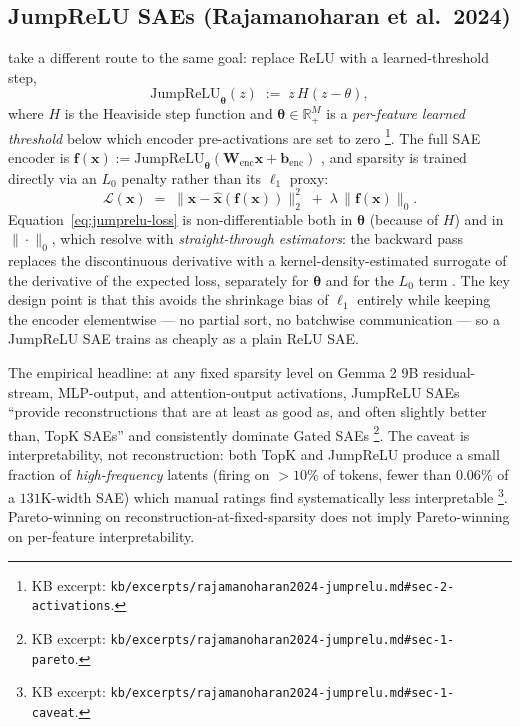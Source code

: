 \subsection{JumpReLU SAEs (Rajamanoharan et al.\ 2024)}
\label{sec:sae-jumprelu}

\citet{rajamanoharan2024-jumprelu} take a different route to the same
goal: replace ReLU with a learned-threshold step,
\begin{equation}
  \mathrm{JumpReLU}_{\boldsymbol{\theta}}(z) \;:=\; z\,H(z - \theta),
  \label{eq:jumprelu}
\end{equation}
where $H$ is the Heaviside step function and
$\boldsymbol{\theta} \in \mathbb{R}^M_+$ is a \emph{per-feature learned
threshold} below which encoder pre-activations are set to zero
\citep[\S 2, Eq.~4]{rajamanoharan2024-jumprelu}\footnote{KB excerpt:
\texttt{kb/excerpts/rajamanoharan2024-jumprelu.md\#sec-2-activations}.}.
The full SAE encoder is
$\mathbf{f}(\mathbf{x}) := \mathrm{JumpReLU}_{\boldsymbol{\theta}}(\mathbf{W}_{\text{enc}}\mathbf{x} + \mathbf{b}_{\text{enc}})$
\citep[\S 3, Eq.~8]{rajamanoharan2024-jumprelu}, and sparsity is
trained directly via an $L_0$ penalty rather than its $\ell_1$ proxy:
\begin{equation}
  \mathcal{L}(\mathbf{x})
  \;=\;
  \|\mathbf{x} - \hat{\mathbf{x}}(\mathbf{f}(\mathbf{x}))\|_2^2
  \;+\;
  \lambda\,\|\mathbf{f}(\mathbf{x})\|_0.
  \label{eq:jumprelu-loss}
\end{equation}
Equation~\eqref{eq:jumprelu-loss} is non-differentiable both in
$\boldsymbol{\theta}$ (because of $H$) and in $\|\cdot\|_0$, which
\citet{rajamanoharan2024-jumprelu} resolve with
\emph{straight-through estimators}: the backward pass replaces the
discontinuous derivative with a kernel-density-estimated surrogate of
the derivative of the expected loss, separately for $\boldsymbol{\theta}$
and for the $L_0$ term \citep[\S 3]{rajamanoharan2024-jumprelu}. The
key design point is that this avoids the shrinkage bias of $\ell_1$
entirely while keeping the encoder elementwise --- no partial sort, no
batchwise communication --- so a JumpReLU SAE trains as cheaply as a
plain ReLU SAE.

The empirical headline: at any fixed sparsity level on Gemma 2 9B
residual-stream, MLP-output, and attention-output activations, JumpReLU
SAEs ``provide reconstructions that are at least as good as, and often
slightly better than, TopK SAEs'' and consistently dominate Gated SAEs
\citep[\S 1]{rajamanoharan2024-jumprelu}\footnote{KB excerpt:
\texttt{kb/excerpts/rajamanoharan2024-jumprelu.md\#sec-1-pareto}.}. The
caveat is interpretability, not reconstruction: both TopK and JumpReLU
produce a small fraction of \emph{high-frequency} latents (firing on
$>10\%$ of tokens, fewer than $0.06\%$ of a $131$K-width SAE) which
manual ratings find systematically less interpretable
\citep[\S 1]{rajamanoharan2024-jumprelu}\footnote{KB excerpt:
\texttt{kb/excerpts/rajamanoharan2024-jumprelu.md\#sec-1-caveat}.}.
Pareto-winning on reconstruction-at-fixed-sparsity does not imply
Pareto-winning on per-feature interpretability.

